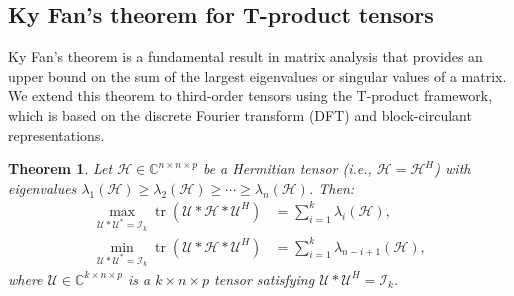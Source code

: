 \documentclass[oupthm]{CUP-JNL-BCM}%
\theoremstyle{oupplain}
\newtheorem{theorem}{Theorem}[section]
\theoremstyle{oupdefinition}
\theoremstyle{oupremark}
\theoremstyle{oupproof}
\numberwithin{equation}{section}
\begin{document}
\subsection{Ky Fan's theorem for T-product tensors}


Ky Fan’s theorem is a fundamental result in matrix analysis that provides an upper bound on the sum of the largest eigenvalues or singular values of a matrix. We extend this theorem to third-order tensors using the T-product framework, which is based on the discrete Fourier transform (DFT) and block-circulant representations.

\begin{theorem}
    Let $\mathcal{H} \in \mathbb{C}^{n \times n \times p}$ be a Hermitian tensor (i.e., $\mathcal{H} = \mathcal{H}^H$) with eigenvalues $\lambda_1(\mathcal{H}) \geq \lambda_2(\mathcal{H}) \geq \cdots \geq \lambda_n(\mathcal{H})$. Then:
\begin{align*}
    \max_{\mathcal{U}*\mathcal{U}^* = \mathcal{I}_k} \operatorname{tr}(\mathcal{U} * \mathcal{H} * \mathcal{U}^H) &= \sum_{i=1}^k \lambda_i(\mathcal{H}), \\
    \min_{\mathcal{U}*\mathcal{U}^* = \mathcal{I}_k} \operatorname{tr}(\mathcal{U} * \mathcal{H} * \mathcal{U}^H) &= \sum_{i=1}^k \lambda_{n-i+1}(\mathcal{H}),
\end{align*}
where $\mathcal{U} \in \mathbb{C}^{k \times n \times p}$ is a $k \times n \times p$ tensor satisfying $\mathcal{U} * \mathcal{U}^H = \mathcal{I}_k$.
\end{theorem}
\end{document}

